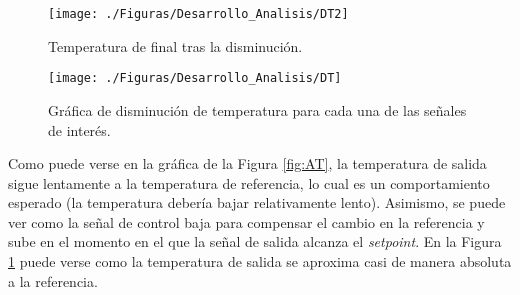 \begin{figure}[H]
\centering
\texttt{[image: ./Figuras/Desarrollo\_Analisis/DT2]}
\caption{Temperatura de final tras la disminución.} 
\label{fig:DT2}
\end{figure}

\begin{figure}[H]
\centering
\texttt{[image: ./Figuras/Desarrollo\_Analisis/DT]}
\caption{Gráfica de disminución de temperatura para cada una de las señales de interés.} 
\label{fig:DT}
\end{figure}

Como puede verse en la gráfica de la Figura \ref{fig:AT}, la temperatura de salida sigue lentamente a la temperatura de referencia, lo cual es un comportamiento esperado (la temperatura debería bajar relativamente lento). Asimismo, se puede ver como la señal de control baja para compensar el cambio en la referencia y sube en el momento en el que la señal de salida alcanza el \textit{setpoint}. En la Figura \ref{fig:DT2} puede verse como la temperatura de salida se aproxima casi de manera absoluta a la referencia. 
